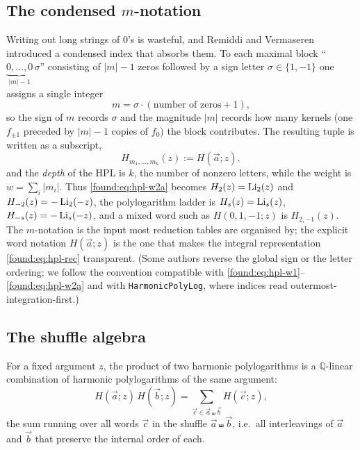 \subsection{The condensed $m$-notation}

Writing out long strings of $0$'s is wasteful, and Remiddi and Vermaseren introduced a condensed index that absorbs them. To each maximal block ``$\underbrace{0,\dots,0}_{|m|-1}\,\sigma$'' consisting of $|m|-1$ zeros followed by a sign letter $\sigma\in\{1,-1\}$ one assigns a single integer
\[
  m=\sigma\cdot(\text{number of zeros}+1),
\]
so the sign of $m$ records $\sigma$ and the magnitude $|m|$ records how many kernels (one $f_{\pm1}$ preceded by $|m|-1$ copies of $f_0$) the block contributes. The resulting tuple is written as a subscript,
\[
  H_{m_1,\dots,m_k}(z):=H(\vec a;z),
\]
and the \emph{depth} of the HPL is $k$, the number of nonzero letters, while the weight is $w=\sum_i|m_i|$. Thus \eqref{found:eq:hpl-w2a} becomes $H_{2}(z)=\operatorname{Li}_2(z)$ and $H_{-2}(z)=-\operatorname{Li}_2(-z)$, the polylogarithm ladder is $H_{s}(z)=\operatorname{Li}_s(z)$, $H_{-s}(z)=-\operatorname{Li}_s(-z)$, and a mixed word such as $H(0,1,-1;z)$ is $H_{2,-1}(z)$. The $m$-notation is the input most reduction tables are organised by; the explicit word notation $H(\vec a;z)$ is the one that makes the integral representation \eqref{found:eq:hpl-rec} transparent. (Some authors reverse the global sign or the letter ordering; we follow the convention compatible with \eqref{found:eq:hpl-w1}--\eqref{found:eq:hpl-w2a} and with \texttt{HarmonicPolyLog}, where indices read outermost-integration-first.)

\subsection{The shuffle algebra}

\begin{theorem}\label{found:thm:hpl-shuffle}
For a fixed argument $z$, the product of two harmonic polylogarithms is a $\mathbb{Q}$-linear combination of harmonic polylogarithms of the same argument:
\[
  H(\vec a;z)\,H(\vec b;z)=\sum_{\vec c\in \vec a\shuffle \vec b}H(\vec c;z),
\]
the sum running over all words $\vec c$ in the shuffle $\vec a\shuffle\vec b$, i.e.\ all interleavings of $\vec a$ and $\vec b$ that preserve the internal order of each.
\end{theorem}

